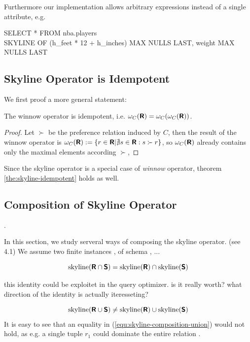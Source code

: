 Furthermore our implementation allows arbitrary expressions instead of a single attribute, e.g.

\begin{sql}
SELECT * FROM nba.players \\
SKYLINE OF (h\_feet * 12 + h\_inches) MAX NULLS LAST, weight MAX NULLS LAST
\end{sql}

\subsection{Skyline Operator is Idempotent}
We first proof a more general statement:
\begin{theorem}\label{the:skyline-idempotent}
The winnow operator is idempotent, i.e. $\omega_C(\textnormal{\bf\textsf{R}})=\omega_C(\omega_C(\textnormal{\bf\textsf{R}}))$.
\end{theorem}
\begin{proof}
Let $\succ$ be the preference relation induced by $C$, then the result of the winnow operator is $\omega_C(\textnormal{\bf\textsf{R}}) := \{r \in \textnormal{\bf\textsf{R}} | \nexists s \in \textnormal{\bf\textsf{R}} : s \succ r \}$, so $\omega_C(\textnormal{\bf\textsf{R}})$ already contains only the maximal elements according $\succ$, 
\end{proof}
Since the skyline operator is a special case of \emph{winnow} operator, theorem \ref{the:skyline-idempotent} holds as well.

\subsection{Composition of Skyline Operator}
 .


In this section, we study serveral ways of composing the skyline operator. (see \citep{Chomicki2002} 4.1)
We assume two finite instances ,  of schema , ...

\begin{equation}
\skyline(\relation{R} \intersection \relation{S}) = \skyline(\relation{R}) \intersection \skyline(\relation{S})
\end{equation}

this identity could be exploitet in the query optimizer. 
is it really worth? what direction of the identity is actually iteresseting?

\begin{equation}\label{equ:skyline-composition-union}
\skyline(\relation{R} \union \relation{S}) \not= \skyline(\relation{R}) \union \skyline(\relation{S})
\end{equation}
It is easy to see that an equality in (\ref{equ:skyline-composition-union}) would not hold, as e.g. a single tuple $r_1$ could dominate the entire relation .

